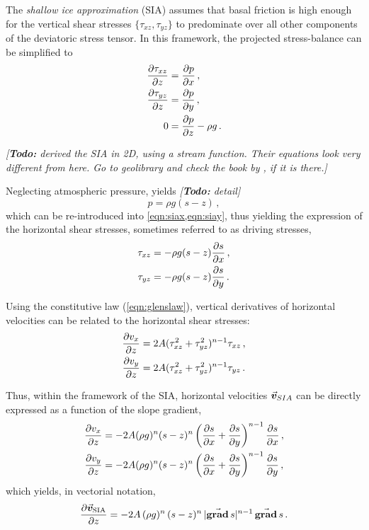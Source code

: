 \documentclass{article}
\newcommand{\todo}[1]{\emph{[\textbf{Todo:} #1]}}
\newcommand{\vect}[1]{\va*{#1}} %
\renewcommand{\grad}[1]{\vect{\mathrm{grad}}\,#1}   %
\newcommand{\vv}[0]{\vect{v}}           %
\newcommand{\vsia}[0]{\vv_{\mathrm{SIA}}}   %
\begin{document}
The \emph{shallow ice approximation} (SIA) assumes that basal friction is high
enough
for the vertical shear stresses $\{\tau_{xz}, \tau_{yz}\}$ to predominate over
all other components of the deviatoric stress tensor. In this framework, the
projected stress-balance can be simplified to
\begin{subequations}
\label{eqn:sia}
\begin{align}
    \label{eqn:siax}
    \pdv{\tau_{xz}}{z} &= \pdv{p}{x} \,, \\
    \label{eqn:siay}
    \pdv{\tau_{yz}}{z} &= \pdv{p}{y} \,, \\
    \label{eqn:siaz}
    0 &= \pdv{p}{z} - \rho g \,.
\end{align}
\end{subequations}

\todo{\citet{Morland.Johnson.1980} derived the SIA in 2D, using a stream
      function. Their equations look very different from here. Go to
      geolibrary and check the book by \citet{Hutter.1983}, if it is there.}

Neglecting atmospheric pressure,  yields \todo{detail}
\begin{equation}
    p = \rho g (s-z) \,,
\end{equation}
which can be re-introduced into \cref{eqn:siax,eqn:siay}, thus yielding the
expression of the horizontal shear stresses, sometimes referred to as driving
stresses,
\begin{subequations}
\begin{align}
    \tau_{xz} &= -\rho g (s-z) \pdv{s}{x} \,, \\
    \tau_{yz} &= -\rho g (s-z) \pdv{s}{y} \,.
\end{align}
\end{subequations}

Using the constitutive law (\ref{eqn:glenslaw}), vertical derivatives of
horizontal velocities can be related to the horizontal shear stresses:
\begin{subequations}
\begin{align}
    \pdv{v_x}{z} &= 2A (\tau_{xz}^2 + \tau_{yz}^2)^{n-1} \tau_{xz} \,, \\
    \pdv{v_y}{z} &= 2A (\tau_{xz}^2 + \tau_{yz}^2)^{n-1} \tau_{yz} \,.
\end{align}
\end{subequations}

Thus, within the framework of the SIA, horizontal velocities $\vv_{SIA}$ can be
directly expressed as a function of the slope gradient,
\begin{subequations}
\begin{align}
    \pdv{v_x}{z} &= -2A (\rho g)^n (s-z)^n
                    \left(\pdv{s}{x}+\pdv{s}{y}\right)^{n-1} \pdv{s}{x} \,, \\
    \pdv{v_y}{z} &= -2A (\rho g)^n (s-z)^n
                    \left(\pdv{s}{x}+\pdv{s}{y}\right)^{n-1} \pdv{s}{y} \,,
\end{align}
\end{subequations}
which yields, in vectorial notation,
\begin{equation}
    \label{eqn:vsia}
    \pdv{\vsia}{z} = -2A\,(\rho g)^n\,(s-z)^n\,|\grad{s}|^{n-1}\,\grad{s} \,.
\end{equation}
\end{document}
